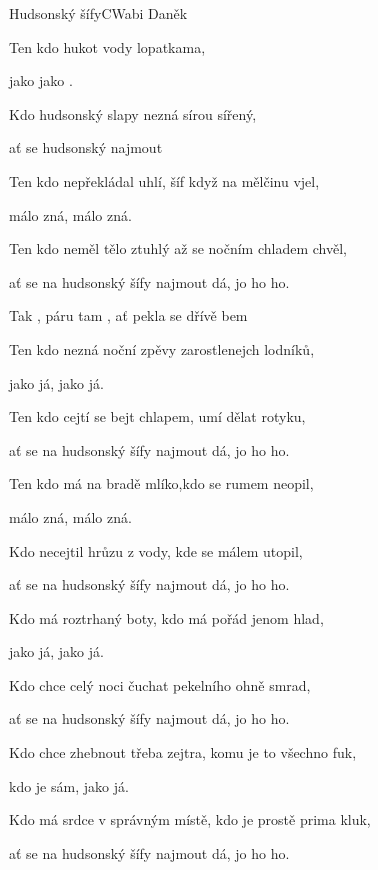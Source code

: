 \setcounter{page}{33}
\begin{song}{Hudsonský šífy}{C}{Wabi Daněk}
\begin{SBVerse}
Ten kdo  hukot vody lopatkama,

jako  jako .

Kdo hudsonský slapy nezná sírou  sířený,
 
ať se hudsonský  najmout    
\end{SBVerse}
\begin{SBVerse}
Ten kdo nepřekládal uhlí, šíf když na mělčinu vjel, 

málo zná, málo zná.

Ten kdo neměl tělo ztuhlý až se nočním chladem chvěl,

ať se na hudsonský šífy najmout dá, jo ho ho.

\end{SBVerse}
\begin{SBChorus}
Tak , páru tam , ať  pekla se dřívě bem

  
\end{SBChorus}
\begin{SBVerse}

Ten kdo nezná noční zpěvy zarostlenejch lodníků,

jako já, jako já.

Ten kdo cejtí se bejt chlapem, umí dělat rotyku,

ať se na hudsonský šífy najmout dá, jo ho ho.
\end{SBVerse}
\begin{SBVerse}
Ten kdo má na bradě mlíko,kdo se rumem neopil, 

málo zná, málo zná.

Kdo necejtil hrůzu z vody, kde se málem utopil,

ať se na hudsonský šífy najmout dá, jo ho ho.
\end{SBVerse}
\begin{SBVerse}
Kdo má roztrhaný boty, kdo má pořád jenom hlad, 

jako já, jako já.

Kdo chce celý noci čuchat pekelního ohně smrad, 

ať se na hudsonský šífy najmout dá, jo ho ho. 
\end{SBVerse}
\begin{SBVerse}
Kdo chce zhebnout třeba zejtra, komu je to všechno fuk,

kdo je sám, jako já.

Kdo má srdce v správným místě, kdo je prostě prima kluk,

ať se na hudsonský šífy najmout dá, jo ho ho.
\end{SBVerse}
\end{song}






\pagebreak
